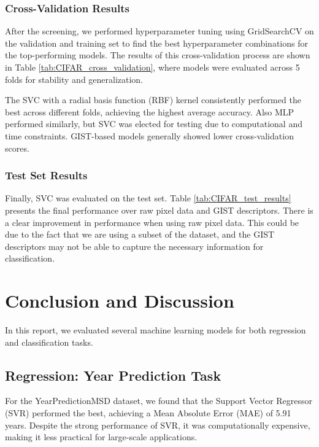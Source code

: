 \documentclass[twocolumn]{article}
\begin{document}
\subsubsection{Cross-Validation Results}
After the screening, we performed hyperparameter tuning using GridSearchCV on the validation and training 
set to find the best hyperparameter combinations for the top-performing models.
 The results of this cross-validation process are shown in Table \ref{tab:CIFAR_cross_validation}, 
 where models were evaluated across 5 folds for stability and generalization.



The SVC with a radial basis function (RBF) kernel consistently performed the best across 
different folds, achieving the highest average accuracy. Also MLP performed similarly, 
but SVC was elected for testing due to computational and time constraints.
GIST-based models generally showed lower cross-validation scores.

\subsubsection{Test Set Results}
Finally, SVC was evaluated on the test set. Table \ref{tab:CIFAR_test_results} 
presents the final performance over raw pixel data and GIST descriptors. There is a clear 
improvement in performance when using raw pixel data. This could be due to the fact that
we are using a subset of the dataset, and the GIST descriptors may not be able to capture
the necessary information for classification.




\section{Conclusion and Discussion}
In this report, we evaluated several machine learning models for both regression and classification tasks.

\subsection{Regression: Year Prediction Task}
For the YearPredictionMSD dataset, we found that the Support Vector Regressor (SVR) 
performed the best, achieving a Mean Absolute Error (MAE) of 5.91 years. 
Despite the strong performance of SVR, it was computationally expensive, making it less practical for large-scale applications.
\end{document}
